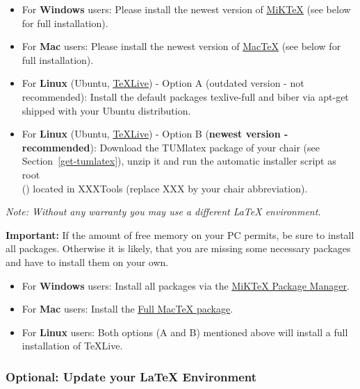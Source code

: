 \begin{itemize}
    \item For \textbf{Windows} users: Please install the newest version of \underline{\href{https://miktex.org/howto/install-miktex}{MiKTeX}} (see below for full installation).
    \item For \textbf{Mac} users: Please install the newest version of \underline{\href{https://www.tug.org/mactex/}{MacTeX}} (see below for full installation).
    \item For \textbf{Linux} (Ubuntu, \underline{\href{https://www.tug.org/texlive/}{TeXLive}}) - Option A (outdated version - not recommended): Install the default packages texlive-full and biber via apt-get shipped with your Ubuntu distribution.
    \item For \textbf{Linux} (Ubuntu, \underline{\href{https://www.tug.org/texlive/}{TeXLive}}) - Option B (\textbf{newest version - recommended}): Download the TUMlatex package of your chair (see Section~\ref{get-tumlatex}), unzip it and run the automatic installer script  as root\\() located in XXXTools (replace XXX by your chair abbreviation).
\end{itemize}

\textit{Note: Without any warranty you may use a different LaTeX environment.}

\vspace{0.3cm}

\textbf{Important:} If the amount of free memory on your PC permits, be sure to install all packages.
Otherwise it is likely, that you are missing some necessary packages and have to install them on your own.

\begin{itemize}
    \item For \textbf{Windows} users: Install all packages via the \underline{\href{https://docs.miktex.org/2.9/manual/pkgmgt.html}{MiKTeX Package Manager}}.
    \item For \textbf{Mac} users: Install the \underline{\href{http://www.tug.org/mactex/mactex-download.html}{Full MacTeX package}}.
    \item For \textbf{Linux} users: Both options (A and B) mentioned above will install a full installation of TeXLive.
\end{itemize}

\subsubsection{Optional: Update your LaTeX Environment}


